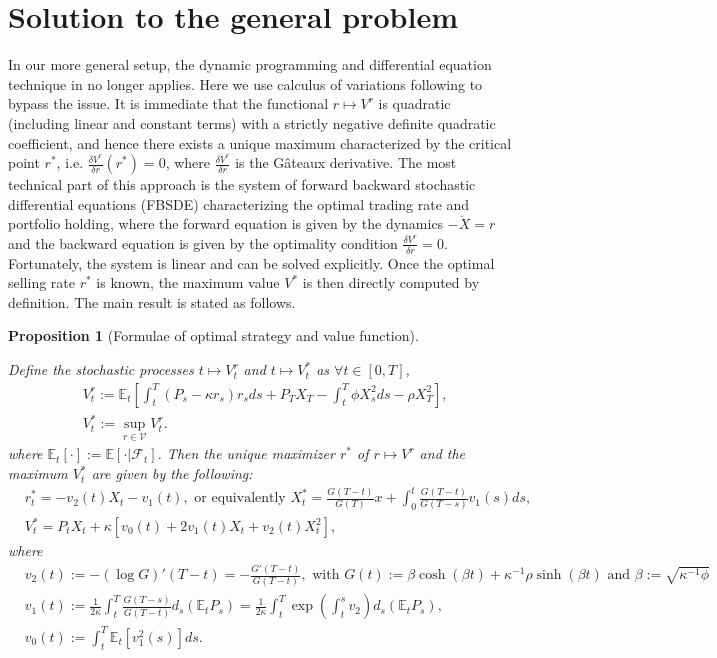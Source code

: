 \documentclass[openany,oneside]{article}
\newtheorem{prop}[thm]{Proposition}
\theoremstyle{definition}
\theoremstyle{remark}
\newcommand{\E}{\mathbb{E}} %
\newcommand{\F}{\mathcal{F}} %
\begin{document}
\section{Solution to the general problem}
In our more general setup, the dynamic programming and differential equation technique in \cite{lehalle2017incorporating} no longer applies. Here we use calculus of variations following \cite{bouchard2017equilibrium} to bypass the issue. It is immediate that the functional $r\mapsto V^r$ is quadratic (including linear and constant terms) with a strictly negative definite quadratic coefficient, and hence there exists a unique maximum characterized by the critical point $r^\ast$, i.e. $\frac{\delta V^r}{\delta r}(r^\ast) =0$, where $\frac{\delta V^r}{\delta r}$ is the G\^ateaux derivative. The most technical part of this approach is the system of forward backward stochastic differential equations (FBSDE) characterizing the optimal trading rate and portfolio holding, where the forward equation is given by the dynamics $-\dot{X}=r$ and the backward equation is given by the optimality condition $\frac{\delta V^r}{\delta r}=0$. Fortunately, the system is linear and can be solved explicitly. Once the optimal selling rate $r^\ast$ is known, the maximum value $V^\ast$ is then directly computed by definition. The main result is stated as follows.

\begin{prop}[Formulae of optimal strategy and value function]\label{main}

Define the stochastic processes $t\mapsto V^r_t$ and $t\mapsto V^\ast_t$ as $\forall t\in[0,T]$,
\begin{align*}
& V^r_t := \E_t \left[\int_t^T (P_s-\kappa r_s)r_s ds + P_T X_T -\int_t^T \phi X_s^2 ds - \rho X_T^2 \right],\\
& V^\ast_t := \sup_{r\in\mathcal{V}} V^r_t.
\end{align*}
where $\E_t[\cdot]:=\E[\cdot \vert \F_t]$. Then the unique maximizer $r^\ast$ of $r\mapsto V^r$ and the maximum $V^\ast_t$ are given by the following:
\begin{align*}
& r^\ast_t = -v_2(t) X_t - v_1(t), \textrm{ or equivalently } X^\ast_t = \frac{G(T-t)}{G(T)}x + \int_0^t \frac{G(T-t)}{G(T-s)} v_1(s) ds, \\
& V^\ast_t = P_t X_t + \kappa\left[v_0(t) + 2 v_1(t) X_t + v_2(t) X_t^2\right],
\end{align*}
where
\begin{align*}
& v_2(t):= -(\log G)'(T-t) = -\frac{G'(T-t)}{G(T-t)}, \textrm{ with } G(t):=\beta\cosh(\beta t)+\kappa^{-1}\rho\sinh(\beta t) \textrm{ and } \beta:=\sqrt{\kappa^{-1}\phi}\\
& v_1(t):= \frac{1}{2\kappa}\int_t^T \frac{G(T-s)}{G(T-t)} d_s(\E_t P_s) = \frac{1}{2\kappa}\int_t^T \exp\left(\int_t^s v_2\right) d_s(\E_t P_s), \\
& v_0(t):= \int_t^T \E_t[v_1^2(s)] ds.
\end{align*}
\end{prop}
\end{document}
